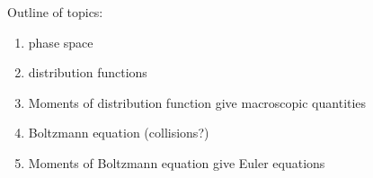 
Outline of topics:
\begin{enumerate}
  \item phase space
  \item distribution functions
  \item Moments of distribution function give macroscopic quantities
  \item Boltzmann equation (collisions?)
  \item Moments of Boltzmann equation give Euler equations
\end{enumerate}
